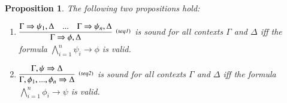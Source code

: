 \documentclass{fcs}
\newtheorem{prop}{Proposition}[section]
\newcommand{\seqArrow}[0]{\Rightarrow}
\begin{document}
\begin{prop}
    \label{prop:sequent}
    The following two propositions hold:
    \begin{enumerate}
        \item $\begin{aligned}\infer[^{(\mathit{seq1})}]
                    {
                        \Gamma\seqArrow \phi, \Delta
                    }
                    {
                        \Gamma\seqArrow \psi_1, \Delta
                        &
                        ...
                        &
                        \Gamma\seqArrow \psi_n, \Delta
                    }\end{aligned}$
              is sound for all contexts $\Gamma$ and $\Delta$
              iff
              the formula $\bigwedge^n_{i=1} \psi_i \to \phi$ is valid.

        \item $\begin{aligned}\infer[^{(\mathit{seq2})}]
                    {
                        \Gamma, \phi_1,...,\phi_n\seqArrow \Delta
                    }
                    {
                        \Gamma, \psi\seqArrow \Delta
                    }\end{aligned}$
            is sound for all contexts $\Gamma$ and $\Delta$
            iff
            the formula $\bigwedge^n_{i=1}\phi_i \to \psi$ is valid.
    \end{enumerate}
\end{prop}
\end{document}
